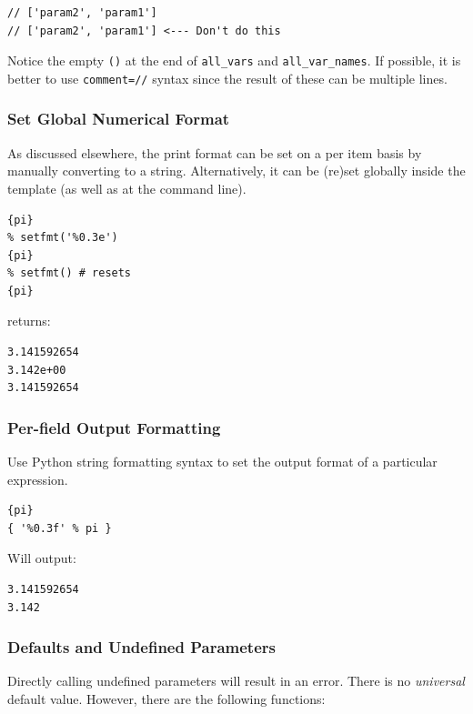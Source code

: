 {\begin{verbatim}
// ['param2', 'param1']
// ['param2', 'param1'] <--- Don't do this
\end{verbatim}

Notice the empty \texttt{()} at the end of \texttt{all\_vars} and
\texttt{all\_var\_names}. If possible, it is better to use
\texttt{comment=\textquotesingle{}//\textquotesingle{}} syntax since the
result of these can be multiple lines.

\subsubsection{Set Global Numerical Format}\label{interfaces:set-global-print-format} 
As discussed elsewhere, the print format can be set on a per item basis
by manually converting to a string. Alternatively, it can be (re)set
globally inside the template (as well as at the command line).

\begin{verbatim}
{pi}
% setfmt('%0.3e')
{pi}
% setfmt() # resets
{pi}
\end{verbatim}

returns:

\begin{verbatim}
3.141592654
3.142e+00
3.141592654
\end{verbatim}

\subsubsection{Per-field Output Formatting}\label{interfaces:per-field-output-formatting}

Use Python string formatting syntax to set the output format of a particular 
expression.

\begin{verbatim}
{pi}
{ '%0.3f' % pi }
\end{verbatim}

Will output:

\begin{verbatim}
3.141592654
3.142
\end{verbatim}

\subsubsection{Defaults and Undefined Parameters}\label{interfaces:using-defaults-undefined-parameters}

Directly calling undefined parameters will result in an error. There is
no \emph{universal} default value. However, there are the following
functions:

}
